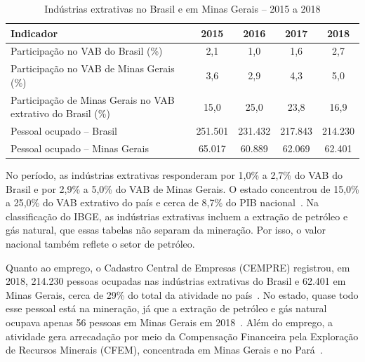 \begin{table}[H]
\centering
\caption{Indústrias extrativas no Brasil e em Minas Gerais -- 2015 a 2018}
\label{tab:ibge_extrativas}
\small
\begin{tabular}{p{7.0cm}cccc}
\hline
\textbf{Indicador} & \textbf{2015} & \textbf{2016} & \textbf{2017} & \textbf{2018} \\
\hline
Participação no VAB do Brasil (\%)                           & 2,1     & 1,0     & 1,6     & 2,7     \\
Participação no VAB de Minas Gerais (\%)                     & 3,6     & 2,9     & 4,3     & 5,0     \\
Participação de Minas Gerais no VAB extrativo do Brasil (\%) & 15,0    & 25,0    & 23,8    & 16,9    \\
Pessoal ocupado -- Brasil                                    & 251.501 & 231.432 & 217.843 & 214.230 \\
Pessoal ocupado -- Minas Gerais                              & 65.017  & 60.889  & 62.069  & 62.401  \\
\hline
\end{tabular}
\end{table}

No período, as indústrias extrativas responderam por 1,0\% a 2,7\% do
VAB do Brasil e por 2,9\% a 5,0\% do VAB de Minas Gerais. O estado
concentrou de 15,0\% a 25,0\% do VAB extrativo do país e cerca de 8,7\%
do PIB nacional~\cite{ibge2020contasregionais}.
Na classificação do IBGE, as indústrias extrativas incluem a extração
de petróleo e gás natural, que essas tabelas não separam da mineração.
Por isso, o valor nacional também reflete o setor de petróleo.

Quanto ao emprego, o Cadastro Central de Empresas (CEMPRE) registrou,
em 2018, 214.230 pessoas ocupadas nas indústrias extrativas do Brasil e
62.401 em Minas Gerais, cerca de 29\% do total da atividade no país~\cite{ibge_cempre6450}.
No estado, quase todo esse pessoal está na mineração, já que a extração de
petróleo e gás natural ocupava apenas 56 pessoas em Minas Gerais em
2018~\cite{ibge_cempre6450}. Além do emprego, a atividade gera
arrecadação por meio da Compensação Financeira pela Exploração de
Recursos Minerais (CFEM), concentrada em Minas Gerais e no Pará~\cite{anm2023informe4}.

